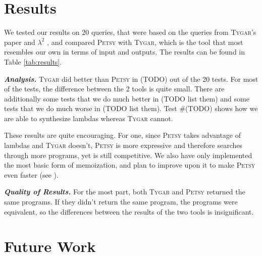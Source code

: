 \documentclass[acmsmall,nonacm]{acmart}
\begin{document}
\section{Results}




We tested our results on 20 queries, that were based on the queries 
from \textsc{Tygar}'s \cite{tygar} paper and ${\lambda^2}$ \cite{lambda2}, and 
compared \textsc{Petsy} with \textsc{Tygar}, 
which is the tool that most resembles our own in terms of input and outputs. 
The results can be found in Table \ref{tab:results}.


\vspace{2mm}
\noindent \textbf{\textit{Analysis.}} 
\textsc{Tygar} did better than \textsc{Petsy} in (TODO) out of the 20 tests. 
For most of the tests, the difference between the 2 tools is quite small. There
are additionally some tests that we do much better in (TODO list them)
and some tests that we do much worse in (TODO list them).
Test \#(TODO) shows how we are able to synthesize lambdas whereas \textsc{Tygar} cannot.

These results are quite encouraging. For one, since \textsc{Petsy} takes advantage of 
lambdas and \textsc{Tygar} doesn't, \textsc{Petsy} is more expressive and therefore searches through 
more programs, yet is still competitive. We also have only implemented the most
basic form of memoization, and plan to improve upon it to make \textsc{Petsy} even
faster (see ).

\vspace{2mm}
\noindent \textbf{\textit{Quality of Results.}} For the most part, both \textsc{Tygar} 
and \textsc{Petsy} returned the same programs. If they didn't return the same program,
the programs were equivalent, so the differences between the results of the two
tools is insignificant. 

\section{Future Work}
\label{future}
\end{document}
